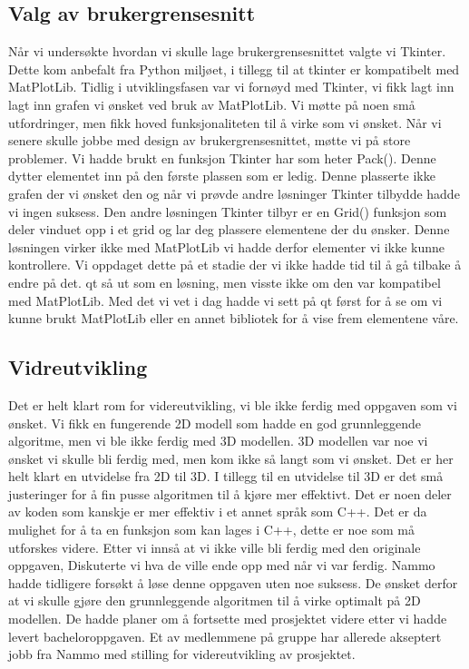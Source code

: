 \subsection{Valg av brukergrensesnitt}
Når vi undersøkte hvordan vi skulle lage brukergrensesnittet valgte vi Tkinter. Dette kom anbefalt fra Python miljøet, i tillegg til at tkinter er kompatibelt med MatPlotLib. Tidlig i utviklingsfasen var vi fornøyd med Tkinter, vi fikk lagt inn lagt inn grafen vi ønsket ved bruk av MatPlotLib. Vi møtte på noen små utfordringer, men fikk hoved funksjonaliteten til å virke som vi ønsket. Når vi senere skulle jobbe med design av brukergrensesnittet, møtte vi på store problemer. Vi hadde brukt en funksjon Tkinter har som heter Pack(). Denne dytter elementet inn på den første plassen som er ledig. Denne plasserte ikke grafen der vi ønsket den og når vi prøvde andre løsninger Tkinter tilbydde hadde vi ingen suksess. Den andre løsningen Tkinter tilbyr er en Grid() funksjon som deler vinduet opp i et grid og lar deg plassere elementene der du ønsker. Denne løsningen virker ikke med MatPlotLib vi hadde derfor elementer vi ikke kunne kontrollere. Vi oppdaget dette på et stadie der vi ikke hadde tid til å gå tilbake å endre på det. qt så ut som en løsning, men visste ikke om den var kompatibel med MatPlotLib. Med det vi vet i dag hadde vi sett på qt først for å se om vi kunne brukt MatPlotLib eller en annet bibliotek for å vise frem elementene våre.





\subsection{Vidreutvikling}
Det er helt klart rom for videreutvikling, vi ble ikke ferdig med oppgaven som vi ønsket. Vi fikk en fungerende 2D modell som hadde en god grunnleggende algoritme, men vi ble ikke ferdig med 3D modellen. 3D modellen var noe vi ønsket vi skulle bli ferdig med, men kom ikke så langt som vi ønsket. Det er her helt klart en utvidelse fra 2D til 3D. I tillegg til en utvidelse til 3D er det små justeringer for å fin pusse algoritmen til å kjøre mer effektivt. Det er noen deler av koden som kanskje er mer effektiv i et annet språk som C++. Det er da mulighet for å ta en funksjon som kan lages i C++, dette er noe som må utforskes videre. 
Etter vi innså at vi ikke ville bli ferdig med den originale oppgaven, Diskuterte vi hva de ville ende opp med når vi var ferdig. Nammo hadde tidligere forsøkt å løse denne oppgaven uten noe suksess. De ønsket derfor at vi skulle gjøre den grunnleggende algoritmen til å virke optimalt på 2D modellen. De hadde planer om å fortsette med prosjektet videre etter vi hadde levert bacheloroppgaven. Et av medlemmene på gruppe har allerede akseptert jobb fra Nammo med stilling for videreutvikling av prosjektet. 





